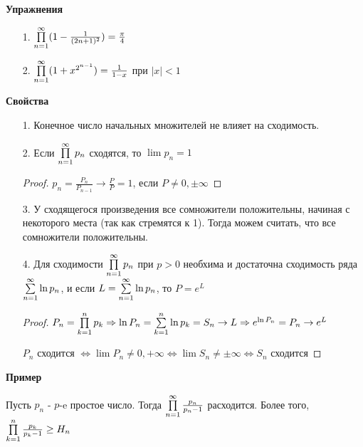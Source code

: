 \textbf{Упражнения}
\begin{enumerate}
    \item [1.] $\prod \limits_{n=1}^\infty (1 - \frac{1}{(2n+1)^2}) = \frac{\pi}{4}$
    \item [2.] $\prod \limits_{n=1}^\infty (1+x^{2^{n-1}}) = \frac{1}{1-x}$ при $|x| < 1$
\end{enumerate}

\textbf{Свойства}
\begin{enumerate}
    \item [1.] Конечное число начальных множителей не влияет на сходимость.
    \item [2.] Если $\prod \limits_{n=1}^\infty p_n$ сходятся, то $\lim p_n = 1$
    \begin{proof}
        $p_n = \frac{P_n}{P_{n-1}} \to \frac{P}{P} = 1$, если $P \neq 0, \pm \infty$
    \end{proof}
    \item [3.] У сходящегося произведения все сомножители положительны, начиная с некоторого места (так как стремятся к 1). Тогда можем считать, что все сомножители положительны.
    \item [4.] Для сходимости $\prod \limits_{n=1}^\infty p_n$ при $p > 0$ необхима и достаточна сходимость ряда $\sum \limits_{n=1}^\infty \ln p_n$,
    и если $L = \sum \limits_{n=1}^\infty \ln p_n$, то $P = e^L$
    \begin{proof}
        $P_n = \prod \limits_{k=1}^n p_k \Rightarrow \ln P_n = \sum \limits_{k=1}^n \ln p_k = S_n \to L \Rightarrow e^{\ln P_n} = P_n \to e^L$

        $P_n$ сходится $\Leftrightarrow \lim P_n \neq 0, +\infty \Leftrightarrow \lim S_n \neq \pm \infty \Leftrightarrow S_n$ сходится
    \end{proof}
\end{enumerate}

\textbf{Пример}

Пусть $p_n$ - $p$-e простое число. Тогда $\prod \limits_{n=1}^\infty \frac{p_n}{p_n - 1}$ расходится.
Более того, $\prod \limits_{k=1}^n \frac{p_k}{p_k - 1} \geq H_n$

